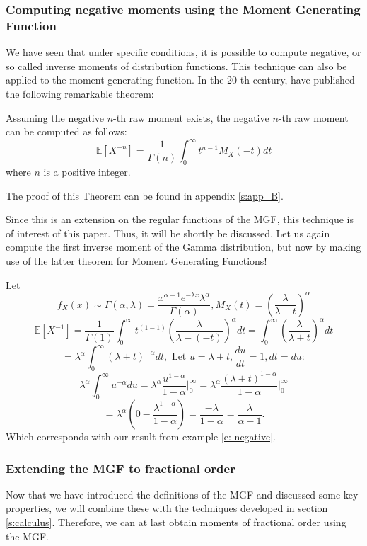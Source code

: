 \subsubsection{Computing negative moments using the Moment Generating Function}
We have seen that under specific conditions, it is possible to compute negative, or so called inverse moments of distribution functions. This technique can also be applied to the moment generating function. In the 20-th century, \cite{cressie1981} have published the following remarkable theorem:

\begin{theorem}\label{t: negative}
    Assuming the negative \(n\)-th raw moment exists, the negative \(n\)-th raw moment can be computed as follows: 
    \[\mathbb{E}[X^{-n}] = \frac{1}{\Gamma(n)} \int_{0}^{\infty} t^{n- 1} M_X(-t) dt\] where \(n\) is a positive integer.
\end{theorem}
The proof of this Theorem can be found in appendix \ref{s:app_B}.

Since this is an extension on the regular functions of the MGF, this technique is of interest of this paper. Thus, it will be shortly be discussed. Let us again compute the first inverse moment of the Gamma distribution, but now by making use of the latter theorem for Moment Generating Functions!

\begin{example}
    Let \[f_X(x) \sim \Gamma(\alpha, \lambda) = 
    \frac{x^{\alpha -1} e^{-\lambda x} \lambda^\alpha} {\Gamma(\alpha)}, M_X(t) = \left(\frac{\lambda}{\lambda - t}\right)^\alpha\]
    \[\mathbb{E}[X^{-1}] = \frac{1}{\Gamma(1)} \int_{0}^{\infty} t^{( 1 - 1)} \left(\frac{\lambda}{\lambda - (-t)}\right)^\alpha dt =  \int_{0}^{\infty} \left(\frac{\lambda}{\lambda + t}\right)^\alpha dt\]
    \[ = \lambda^\alpha \int_{0}^{\infty} (\lambda + t)^{-\alpha} dt, \text{ Let } u = \lambda + t, \frac{du}{dt} = 1, dt = du:\]
    \[ \lambda^\alpha \int_{0}^{\infty} u^{-\alpha} du
    =  \lambda^\alpha \frac{u^{ 1-\alpha}}{1 -\alpha}\Big|_{0}^{\infty} = \lambda^\alpha \frac{(\lambda + t)^{1 -\alpha}}{1 -\alpha}\Big|_{0}^{\infty}\]
    \[= \lambda^\alpha\left( 0 - \frac{\lambda^{ 1 - \alpha}}{1 -\alpha}\right) = \frac{-\lambda}{ 1 - \alpha} = \frac{\lambda}{\alpha - 1}.\] Which corresponds with our result from example \ref{e: negative}.
\end{example}

\subsubsection{Extending the MGF to fractional order}
Now that we have introduced the definitions of the MGF and discussed some key properties, we will combine these with the techniques developed in section \ref{s:calculus}. Therefore, we can at last obtain moments of fractional order using the MGF.


